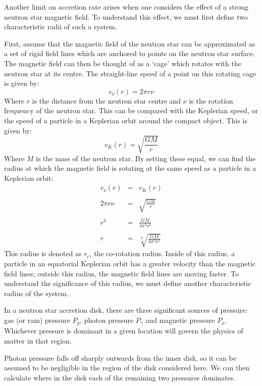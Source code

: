 \par Another limit on accretion rate arises when one considers the effect of a strong neutron star magnetic field.  To understand this effect, we must first define two characteristic radii of such a system.
\par First, assume that the magnetic field of the neutron star can be approximated as a set of rigid field lines which are anchored to points on the neutron star surface.  The magnetic field can then be thought of as a `cage' which rotates with the neutron star at its centre.  The straight-line speed of a point on this rotating cage is given by:
\begin{equation}
v_\nu(r)=2\pi r\nu
\end{equation}
Where $r$ is the distance from the neutron star centre and $\nu$ is the rotation frequency of the neutron star.  This can be compared with the Keplerian speed, or the speed of a particle in a Keplerian orbit around the compact object.  This is given by:
\begin{equation}
v_K(r)=\sqrt{\frac{GM}{r}}
\end{equation}
Where $M$ is the mass of the neutron star.  By setting these equal, we can find the radius at which the magnetic field is rotating at the same speed as a particle in a Keplerian orbit:
\begin{eqnarray}
v_\nu(r)&=&v_K(r)\\ \nonumber \\
2\pi r\nu&=&\sqrt{\frac{GM}{r}}\\ \nonumber \\
r^3&=&\frac{GM}{4\pi^2\nu^2}\\ \nonumber \\
r&=&\sqrt[3]{\frac{GM}{4\pi^2\nu^2}}
\end{eqnarray}
This radius is denoted as $r_c$, the co-rotation radius.  Inside of this radius, a particle in an equatorial Keplerian orbit has a greater velocity than the magnetic field lines; outside this radius, the magnetic field lines are moving faster.  To understand the significance of this radius, we must define another characteristic radius of the system.
\par In a neutron star accretion disk, there are three significant sources of pressure: gas (or ram) pressure $P_g$, photon pressure $P_\gamma$ and magnetic pressure $P_\mu$.  Whichever pressure is dominant in a given location will govern the physics of matter in that region.
\par Photon pressure falls off sharply outwards from the inner disk, so it can be assumed to be negligible in the region of the disk considered here.  We can then calculate where in the disk each of the remaining two pressures dominates.
